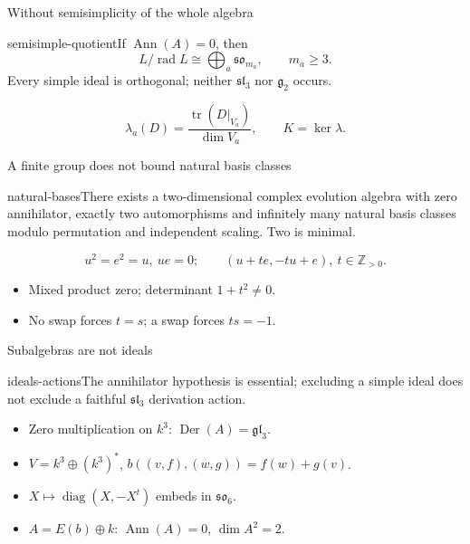 \documentclass{beamer}
\begin{document}
\begin{frame}{Without semisimplicity of the whole algebra}
\begin{bookresult}{semisimple-quotient}If $\operatorname{Ann}(A)=0$, then\[L/\operatorname{rad}L\cong\bigoplus_a\mathfrak{so}_{m_a},\qquad m_a\ge3.\]Every simple ideal is orthogonal; neither $\mathfrak{sl}_3$ nor $\mathfrak g_2$ occurs.\end{bookresult}\[\lambda_a(D)=\frac{\operatorname{tr}(D|_{V_a})}{\dim V_a},\qquad K=\ker\lambda.\]
\end{frame}
\begin{frame}{A finite group does not bound natural basis classes}
\begin{bookresult}{natural-bases}There exists a two-dimensional complex evolution algebra with zero annihilator, exactly two automorphisms and infinitely many natural basis classes modulo permutation and independent scaling. Two is minimal.\end{bookresult}\[u^2=e^2=u,\ ue=0;\qquad (u+te,-tu+e),\ t\in\mathbb Z_{>0}.\]\begin{itemize}\item Mixed product zero; determinant $1+t^2\ne0$.\item No swap forces $t=s$; a swap forces $ts=-1$.\end{itemize}
\end{frame}
\begin{frame}{Subalgebras are not ideals}
\begin{bookresult}{ideals-actions}The annihilator hypothesis is essential; excluding a simple ideal does not exclude a faithful $\mathfrak{sl}_3$ derivation action.\end{bookresult}\begin{itemize}\item Zero multiplication on $k^3$: $\operatorname{Der}(A)=\mathfrak{gl}_3$.\item $V=k^3\oplus(k^3)^*$, $b((v,f),(w,g))=f(w)+g(v)$.\item $X\mapsto\operatorname{diag}(X,-X^t)$ embeds in $\mathfrak{so}_6$.\item $A=E(b)\oplus k$: $\operatorname{Ann}(A)=0$, $\dim A^2=2$.\end{itemize}
\end{frame}
\end{document}
